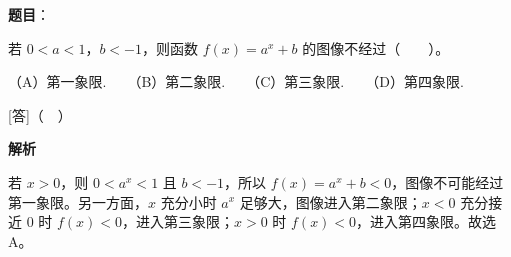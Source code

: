 \begin{answer}

\textbf{题目}：

若 $0<a<1$，$b<-1$，则函数 $f(x)=a^x+b$ 的图像不经过\mbox{（　　）}。

（A）第一象限.　　（B）第二象限.　　（C）第三象限.　　（D）第四象限.

[答]（　）

\textbf{解析}

若 $x>0$，则 $0<a^x<1$ 且 $b<-1$，所以 $f(x)=a^x+b<0$，图像不可能经过第一象限。另一方面，$x$ 充分小时 $a^x$ 足够大，图像进入第二象限；$x<0$ 充分接近 $0$ 时 $f(x)<0$，进入第三象限；$x>0$ 时 $f(x)<0$，进入第四象限。故选 A。


\end{answer}

